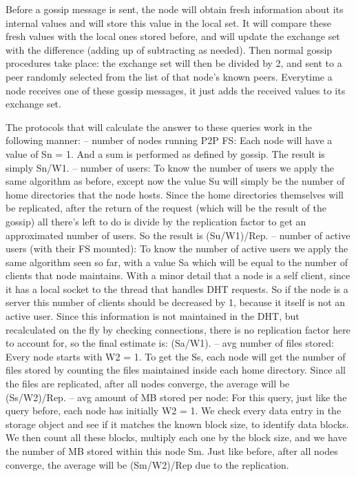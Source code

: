 \documentclass[times,9pt,article]{llncs}
\begin{document}
Before a gossip message is sent, the node will obtain fresh information about its internal values and will store this value in the local set. It will compare these fresh values with the local ones stored before, and will update the exchange set with the difference (adding up of subtracting as needed). Then normal gossip procedures take place: the exchange set will then be divided by 2, and sent to a peer randomly selected from the list of that node's known peers. Everytime a node receives one of these gossip messages, it just adds the received values to its exchange set.

The protocols that will calculate the answer to these queries work in the following manner: 
– number of nodes running P2P FS: Each node will have a value of Sn = 1. And a
sum is performed as defined by gossip. The result is simply Sn/W1.
– number of users: To know the number of users we apply the same algorithm as
before, except now the value Su will simply be the number of home directories that the node hosts. Since the home directories themselves will be replicated, after the return of the request (which will be the result of the gossip) all there’s left to do is divide by the replication factor to get an approximated number of users. So the result is (Su/W1)/Rep.
– number of active users (with their FS mounted): To know the number of active
users we apply the same algorithm seen so far, with a value Sa which will be equal
to the number of clients that node maintains. With a minor detail that a node is a self client, since it has a local socket to the thread that handles DHT requests. So if the node is a server this number of clients should be decreased by 1, because it itself is not an active user. Since this information is not maintained in the DHT, but recalculated on the fly by checking connections, there is no replication factor here to account for, so the final estimate is: (Sa/W1).
– avg number of ﬁles stored: Every node starts with W2 = 1. To get the Ss, each node will get the number of ﬁles stored by counting the ﬁles maintained inside each home directory. Since all the ﬁles are replicated, after all nodes converge, the average will be (Ss/W2)/Rep.
– avg amount of MB stored per node: For this query, just like the query before, each node has
initially W2 = 1. We check every data entry in the storage object and see if it matches the known block size, to identify data blocks. We then count all these blocks, multiply each one by the block size, and we have the number of MB stored within this node Sm. Just like before, after all nodes converge, the average will be (Sm/W2)/Rep due to the replication.
\end{document}

